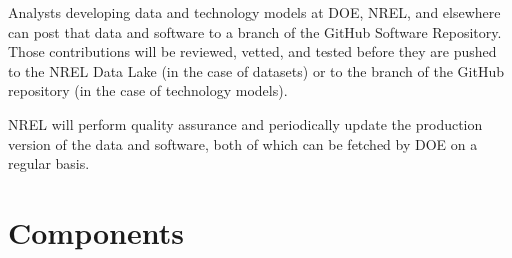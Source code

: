 \documentclass[letterpaper,10pt,english]{sphinxmanual}
\begin{document}
\sphinxAtStartPar
Analysts developing data and technology models at DOE, NREL, and
elsewhere can post that data and software to a branch of the GitHub
Software Repository. Those contributions will be reviewed, vetted, and
tested before they are pushed to the NREL Data Lake (in the case of
datasets) or to the  branch of the GitHub repository (in
the case of technology models).

\sphinxAtStartPar
NREL will perform quality assurance and periodically update the
production version of the data and software, both of which can be
fetched by DOE on a regular basis.


\section{Components}
\label{\detokenize{deployment:components}}
\end{document}
